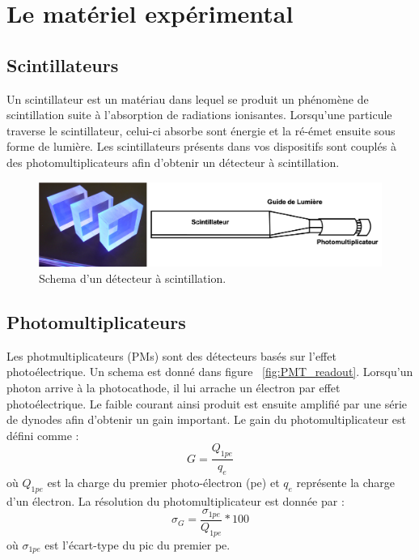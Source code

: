 \section{Le matériel expérimental}

\subsection{Scintillateurs}
\label{subsec:scint}

Un scintillateur est un matériau dans lequel se produit un phénomène de scintillation suite à l'absorption de radiations ionisantes. Lorsqu'une particule traverse le scintillateur, celui-ci absorbe sont énergie et la ré-émet ensuite sous forme de lumière. Les scintillateurs présents dans vos dispositifs sont couplés à des photomultiplicateurs afin d'obtenir un détecteur à scintillation.

\begin{figure}[h]
    \centering
	\includegraphics[width=\textwidth]{figures/Scintillateur.png}
    \caption{Schema d'un détecteur à scintillation.}
    \label{fig:Scintillateur} 
\end{figure}

\FloatBarrier

\subsection{Photomultiplicateurs}
\label{subsec:PMT}
Les photmultiplicateurs (PMs) sont des détecteurs basés sur l'effet photoélectrique. Un schema est donné dans figure ~\ref{fig:PMT_readout}. Lorsqu'un photon arrive à la photocathode, il lui arrache un électron par effet photoélectrique. Le faible courant ainsi produit est ensuite amplifié par une série de dynodes afin d'obtenir un gain important. Le gain du photomultiplicateur est défini comme :
\begin{equation}
G = \frac{Q_{1pe}}{q_{e}} 
\end{equation}
où $Q_{1pe}$ est la charge du premier photo-électron (pe) et $q_{e}$ représente la charge d'un électron. La résolution du photomultiplicateur est donnée par :
\begin{equation}
\sigma_{G} =  \frac{\sigma_{1pe}}{Q_{1pe}} * 100
\end{equation}
où $\sigma_{1pe}$ est l'écart-type du pic du premier pe.

